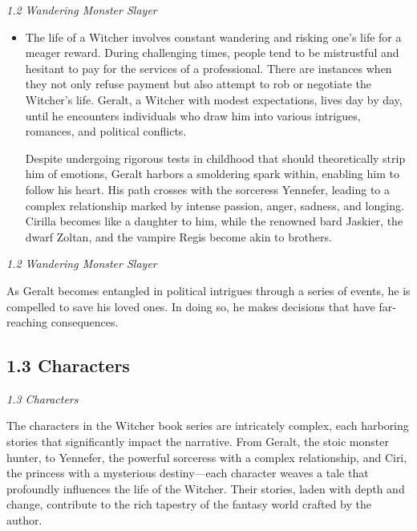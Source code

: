 \documentclass[xcolor=dvipsnames]{beamer}
\begin{document}
\begin{frame}{\textit{1.2 Wandering Monster Slayer}}
    \begin{itemize}

    \item The life of a Witcher involves constant wandering and risking one's life for a meager reward. During challenging times, people tend to be mistrustful and hesitant to pay for the services of a professional. There are instances when they not only refuse payment but also attempt to rob or negotiate the Witcher's life. Geralt, a Witcher with modest expectations, lives day by day, until he encounters individuals who draw him into various intrigues, romances, and political conflicts.
    
    Despite undergoing rigorous tests in childhood that should theoretically strip him of emotions, Geralt harbors a smoldering spark within, enabling him to follow his heart. His path crosses with the sorceress Yennefer, leading to a complex relationship marked by intense passion, anger, sadness, and longing. Cirilla becomes like a daughter to him, while the renowned bard Jaskier, the dwarf Zoltan, and the vampire Regis become akin to brothers.
    \end{itemize}
    
\end{frame}  

\begin{frame}{\textit{1.2 Wandering Monster Slayer}}
    \begin{itemize}    
    As Geralt becomes entangled in political intrigues through a series of events, he is compelled to save his loved ones. In doing so, he makes decisions that have far-reaching consequences.
    \end{itemize}
    
\end{frame}

\subsection{1.3 Characters}
\begin{frame}{\textit{1.3 Characters}}

    \begin{itemize}
    The characters in the Witcher book series are intricately complex, each harboring stories that significantly impact the narrative. From Geralt, the stoic monster hunter, to Yennefer, the powerful sorceress with a complex relationship, and Ciri, the princess with a mysterious destiny—each character weaves a tale that profoundly influences the life of the Witcher. Their stories, laden with depth and change, contribute to the rich tapestry of the fantasy world crafted by the author.
    \end{itemize}
    
\end{frame}
\end{document}
